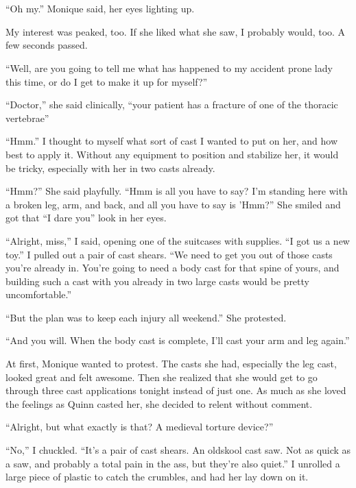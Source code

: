 \chapter{}
``Oh my.'' Monique said, her eyes lighting up.

My interest was peaked, too. If she liked what she saw, I probably would, too. A few
seconds passed.

``Well, are you going to tell me what has happened to my accident prone lady this time, or
do I get to make it up for myself?''

``Doctor,'' she said clinically, ``your patient has a fracture of one of the thoracic
vertebrae''

``Hmm.'' I thought to myself what sort of cast I wanted to put on her, and how best to apply
it. Without any equipment to position and stabilize her, it would be tricky, especially with her
in two casts already.

``Hmm?'' She said playfully. ``Hmm is all you have to say? I'm standing here with a broken
leg, arm, and back, and all you have to say is 'Hmm?'' She smiled and got that ``I dare you''
look
in her eyes.

``Alright, miss,'' I said, opening one of the suitcases with supplies. ``I got us a new toy.''
I pulled out a pair of cast shears. ``We need to get you out of those casts you're already in.
You're going to need a body cast for that spine of yours, and building such a cast with you
already in two large casts would be pretty uncomfortable.''

``But the plan was to keep each injury all weekend.'' She protested.

``And you will. When the body cast is complete, I'll cast your arm and leg again.''

\begin{thought}
At first, Monique wanted to protest. The casts she had, especially the leg cast, looked
great and felt awesome. Then she realized that she would get to go through three cast
applications tonight instead of just one. As much as she loved the feelings as Quinn casted her,
she decided to relent without comment.
\end{thought}

``Alright, but what exactly is that? A medieval torture device?''

``No,'' I chuckled. ``It's a pair of cast shears. An oldskool cast saw. Not as quick as a saw,
and probably a total pain in the ass, but they're also quiet.'' I unrolled a large piece of
plastic to catch the crumbles, and had her lay down on it.

